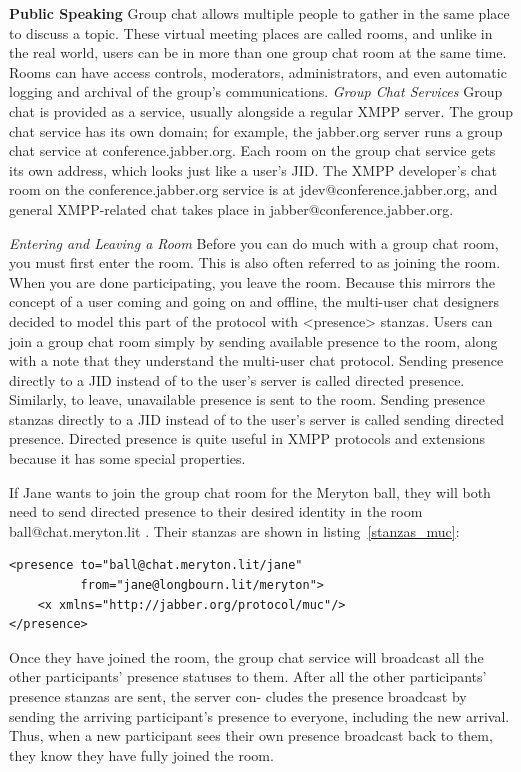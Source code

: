 \textbf{Public Speaking}
\newline
Group chat allows multiple people to gather in the same place to discuss a topic. These virtual meeting places are called rooms, and unlike in the real world, users can be in more than one group chat room at the same time. Rooms can have access controls, moderators, administrators, and even automatic logging and archival of the group’s communications.
\emph{Group Chat Services}
\newline
Group chat is provided as a service, usually alongside a regular XMPP server. The group chat service has its own domain; for example, the jabber.org server runs a group chat service at conference.jabber.org. Each room on the group chat service gets its own address, which looks just like a user’s JID. The XMPP developer’s chat room on the conference.jabber.org service is at jdev@conference.jabber.org, and general XMPP-related chat takes place in jabber@conference.jabber.org.

\emph{Entering and Leaving a Room}
Before you can do much with a group chat room, you must first enter the room. This is also often referred to as joining the room. When you are done participating, you leave the room. Because this mirrors the concept of a user coming and going on and offline, the multi-user chat designers decided to model this part of the protocol with <presence> stanzas. Users can join a group chat room simply by sending available presence to the room, along with a note that they understand the multi-user chat protocol. Sending presence directly to a JID instead of to the user’s server is called directed presence. Similarly, to leave, unavailable presence is sent to the room. Sending presence stanzas directly to a JID instead of to the user’s server is called sending directed presence. Directed presence is quite useful in XMPP protocols and extensions because it has some special properties.

If Jane wants to join the group chat room for the Meryton ball, they will both need to send directed presence to their desired identity in the room ball@chat.meryton.lit . Their stanzas are shown in listing~\ref{stanzas_muc}:
\begin{lstlisting}[label=stanzas_muc,caption=Stanzas Format for MUC]
<presence to="ball@chat.meryton.lit/jane"
          from="jane@longbourn.lit/meryton">
    <x xmlns="http://jabber.org/protocol/muc"/>
</presence>
\end{lstlisting}
Once they have joined the room, the group chat service will broadcast all the other participants' presence statuses to them. After all the other participants’ presence stanzas are sent, the server con- cludes the presence broadcast by sending the arriving participant’s presence to everyone, including the new arrival. Thus, when a new participant sees their own presence broadcast back to them, they know they have fully joined the room.

